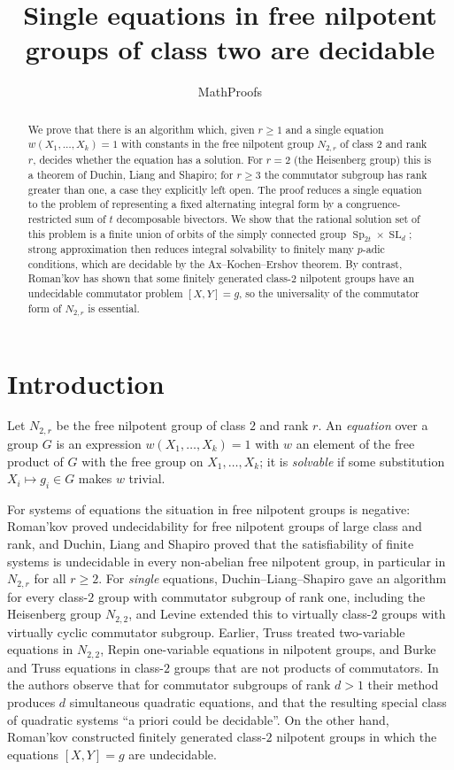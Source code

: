 \documentclass[11pt]{amsart}
\title{Single equations in free nilpotent groups of class two are decidable}
\author{MathProofs}
\date{}
\theoremstyle{definition}
\theoremstyle{remark}
\newcommand{\Sp}{\operatorname{Sp}}
\newcommand{\SL}{\operatorname{SL}}
\begin{document}
\begin{abstract}
We prove that there is an algorithm which, given $r\ge 1$ and a single equation
$w(X_1,\dots,X_k)=1$ with constants in the free nilpotent group $N_{2,r}$ of class
$2$ and rank $r$, decides whether the equation has a solution. For $r=2$ (the
Heisenberg group) this is a theorem of Duchin, Liang and Shapiro; for $r\ge 3$ the
commutator subgroup has rank greater than one, a case they explicitly left open.
The proof reduces a single equation to the problem of representing a fixed
alternating integral form by a congruence-restricted sum of $t$ decomposable
bivectors. We show that the rational solution set of this problem is a finite
union of orbits of the simply connected group $\Sp_{2t}\times\SL_d$; strong
approximation then reduces integral solvability to finitely many $p$-adic
conditions, which are decidable by the Ax--Kochen--Ershov theorem. By contrast,
Roman'kov has shown that some finitely generated class-$2$ nilpotent groups have
an undecidable commutator problem $[X,Y]=g$, so the universality of the
commutator form of $N_{2,r}$ is essential.
\end{abstract}

\maketitle

\section{Introduction}

Let $N_{2,r}$ be the free nilpotent group of class $2$ and rank $r$. An
\emph{equation} over a group $G$ is an expression $w(X_1,\dots,X_k)=1$ with $w$ an
element of the free product of $G$ with the free group on $X_1,\dots,X_k$; it is
\emph{solvable} if some substitution $X_i\mapsto g_i\in G$ makes $w$ trivial.

For systems of equations the situation in free nilpotent groups is negative:
Roman'kov \cite{Rom77} proved undecidability for free nilpotent groups of large
class and rank, and Duchin, Liang and Shapiro \cite[Thm.~4]{DLS} proved that the
satisfiability of finite systems is undecidable in every non-abelian free
nilpotent group, in particular in $N_{2,r}$ for all $r\ge 2$. For \emph{single}
equations, Duchin--Liang--Shapiro \cite[Thm.~3]{DLS} gave an algorithm for every
class-$2$ group with commutator subgroup of rank one, including the Heisenberg
group $N_{2,2}$, and Levine \cite{Lev} extended this to virtually class-$2$ groups
with virtually cyclic commutator subgroup. Earlier, Truss \cite{Tru} treated
two-variable equations in $N_{2,2}$, Repin \cite{Rep83,Rep84} one-variable equations
in nilpotent groups, and Burke and Truss \cite{BT} equations in class-$2$ groups
that are not products of commutators. In \cite[\S2]{DLS} the authors observe that
for commutator subgroups of rank $d>1$ their method produces $d$ simultaneous
quadratic equations, and that the resulting special class of quadratic systems
``a priori could be decidable''. On the other hand, Roman'kov \cite{Rom16a}
constructed finitely generated class-$2$ nilpotent groups in which the equations
$[X,Y]=g$ are undecidable.
\end{document}

